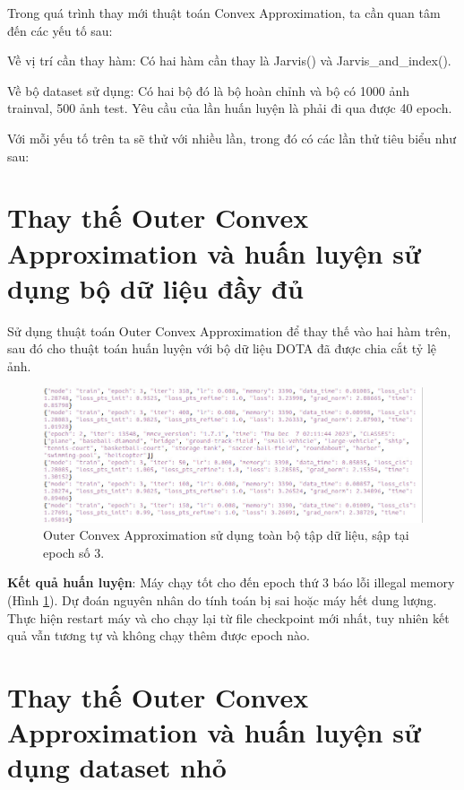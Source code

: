 \documentclass[12pt,a4paper,openany,oneside]{report}
\begin{document}
Trong quá trình thay mới thuật toán Convex Approximation, ta cần quan tâm đến các yếu tố sau:

Về vị trí cần thay hàm: Có hai hàm cần thay là Jarvis() và Jarvis\_and\_index().

Về bộ dataset sử dụng: Có hai bộ đó là bộ hoàn chỉnh và bộ có 1000 ảnh trainval, 500 ảnh test. Yêu cầu của lần huấn luyện là phải đi qua được 40 epoch.

Với mỗi yếu tố trên ta sẽ thử với nhiều lần, trong đó có các lần thử tiêu biểu như sau:

\section{Thay thế Outer Convex Approximation và huấn luyện sử dụng bộ dữ liệu đầy đủ}

Sử dụng thuật toán Outer Convex Approximation để thay thế vào hai hàm trên, sau đó cho thuật toán huấn luyện với bộ dữ liệu DOTA đã được chia cắt tỷ lệ ảnh.\\

\begin{figure}[ht!]
	\begin{center}
		\includegraphics[width=450px]{./outer_fulldata_epoch3.JPG}
		\caption{Outer Convex Approximation sử dụng toàn bộ tập dữ liệu, sập tại epoch số 3.}
		\label{outer_fulldata_epoch3}
	\end{center}
\end{figure} 

\textbf{Kết quả huấn luyện}: Máy chạy tốt cho đến epoch thứ 3 báo lỗi illegal memory (Hình \ref{outer_fulldata_epoch3}). Dự đoán nguyên nhân do tính toán bị sai hoặc máy hết dung lượng. Thực hiện restart máy và cho chạy lại từ file checkpoint mới nhất, tuy nhiên kết quả vẫn tương tự và không chạy thêm được epoch nào.
\section{Thay thế Outer Convex Approximation và huấn luyện sử dụng dataset nhỏ}
\end{document}
